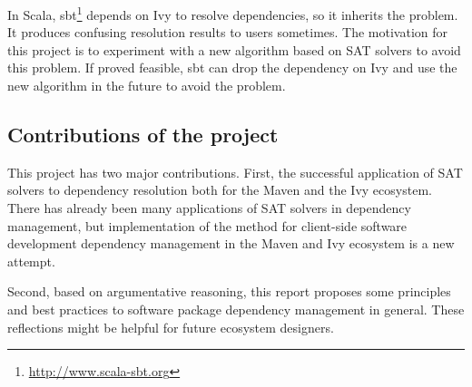 In Scala, sbt\footnote{\url{http://www.scala-sbt.org}} depends on Ivy to resolve dependencies, so it inherits the problem. It produces confusing resolution results to users sometimes. The motivation for this project is to experiment with a new algorithm based on SAT solvers to avoid this problem. If proved feasible, sbt can drop the dependency on Ivy and use the new algorithm in the future to avoid the problem.

\subsection{Contributions of the project}

This project has two major contributions. First, the successful application of SAT solvers to dependency resolution both for the Maven and the Ivy ecosystem. There has already been many applications of SAT solvers in dependency management\cite{mancinelli2006managing, vouillon2013software, berre2009dependency}, but implementation of the method for client-side software development dependency management in the Maven and Ivy ecosystem is a new attempt.

Second, based on argumentative reasoning, this report proposes some principles and best practices to software package dependency management in general. These reflections might be helpful for future ecosystem designers.





